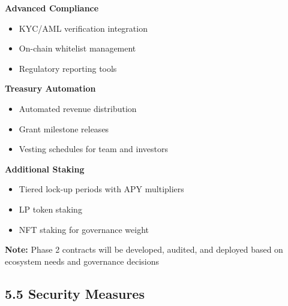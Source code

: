 \documentclass[
  paper=a4,
  ,captions=tableheading
]{scrartcl}
\makeatletter
\newcommand*\pandocbounded[1]{%
  \sbox\pandoc@box{#1}%
  \Gscale@div\@tempa{\textheight}{\dimexpr\ht\pandoc@box+\dp\pandoc@box\relax}%
  \Gscale@div\@tempb{\linewidth}{\wd\pandoc@box}%
  \ifdim\@tempb\p@<\@tempa\p@\let\@tempa\@tempb\fi%
  \ifdim\@tempa\p@<\p@\scalebox{\@tempa}{\usebox\pandoc@box}%
  \else\usebox{\pandoc@box}%
  \fi%
}
\providecommand{\tightlist}{%
  \setlength{\itemsep}{0pt}\setlength{\parskip}{0pt}}
\makeatother
\begin{document}
\textbf{Advanced Compliance}

\begin{itemize}
\tightlist
\item
  KYC/AML verification integration
\item
  On-chain whitelist management
\item
  Regulatory reporting tools
\end{itemize}

\textbf{Treasury Automation}

\begin{itemize}
\tightlist
\item
  Automated revenue distribution
\item
  Grant milestone releases
\item
  Vesting schedules for team and investors
\end{itemize}

\textbf{Additional Staking}

\begin{itemize}
\tightlist
\item
  Tiered lock-up periods with APY multipliers
\item
  LP token staking
\item
  NFT staking for governance weight
\end{itemize}

\textbf{Note:} Phase 2 contracts will be developed, audited, and deployed based on ecosystem needs and governance decisions

\subsection{5.5 Security Measures}\label{security-measures}
\end{document}
